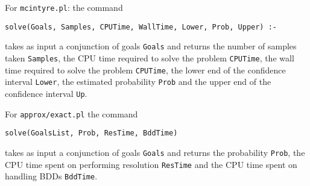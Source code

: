 \documentclass[a4paper,10pt]{article}
\begin{document}
For \texttt{mcintyre.pl}:
the command 
\begin{verbatim}
solve(Goals, Samples, CPUTime, WallTime, Lower, Prob, Upper) :-
\end{verbatim}
takes as input a conjunction of goals \texttt{Goals} and returns the number of samples taken \texttt{Samples}, 
the CPU time required to solve the problem \texttt{CPUTime}, the wall time required to solve the problem \texttt{CPUTime}, the
lower end of the confidence interval \texttt{Lower}, the estimated probability \texttt{Prob} and the upper end of the confidence interval \texttt{Up}.

For \texttt{approx/exact.pl}
the command 
\begin{verbatim}
solve(GoalsList, Prob, ResTime, BddTime) 
\end{verbatim}
takes as input a conjunction of goals \texttt{Goals} and returns the probability \texttt{Prob}, the CPU time spent on performing resolution \texttt{ResTime} and the CPU time spent on handling BDDs \texttt{BddTime}.
\end{document}
